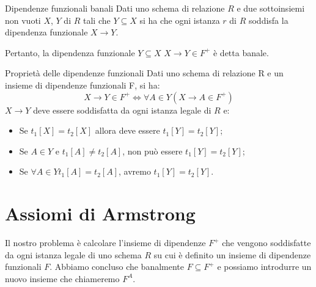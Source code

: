 \begin{Osservation}{Dipendenze funzionali banali}{}\label{oss:dipendenze-funzionali}
    Dati uno schema di relazione $R$ e due sottoinsiemi non vuoti $X$, $Y$ di $R$ tali che $Y\subseteq X$ si ha che ogni istanza $r$ di $R$ soddisfa la dipendenza funzionale $X\to Y$.

    Pertanto, la dipendenza funzionale $Y\subseteq X$ $X\to Y\in F^+$ è detta banale.
\end{Osservation}

\begin{Proposition}{Proprietà delle dipendenze funzionali}{}\label{prop:dipendenze-funzionali}
    Dati uno schema di relazione R e un insieme di dipendenze funzionali F, si ha:
    \begin{equation*}
        X\to Y\in F^+\iff \forall A\in Y(X\to A\in F^+)
    \end{equation*}
    $X\to Y$ deve essere soddisfatta da ogni istanza legale di $R$ e:
    \begin{itemize}
        \item Se $t_1[X]=t_2[X]$ allora deve essere $t_1[Y]=t_2[Y]$;
        \item Se $A\in Y$ e $t_1[A]\neq t_2[A]$, non può essere $t_1[Y]=t_2[Y]$;
        \item Se $\forall A\in Y t_1[A]=t_2[A]$, avremo $t_1[Y]=t_2[Y]$.
    \end{itemize}
\end{Proposition}

\section{Assiomi di Armstrong}
Il nostro problema è calcolare l'insieme di dipendenze $F^+$ che vengono soddisfatte da ogni istanza legale di uno schema $R$ su cui è definito un insieme di dipendenze funzionali $F$. Abbiamo concluso che banalmente $F\subseteq F^+$ e possiamo introdurre un nuovo insieme che chiameremo $F^A$.

